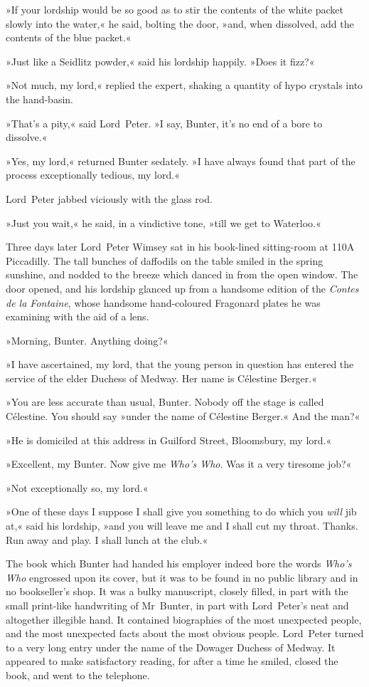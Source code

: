 »If your lordship would be so good as to stir the contents of the white packet slowly into the water,« he said, bolting the door, »and, when dissolved, add the contents of the blue packet.«

»Just like a Seidlitz powder,« said his lordship happily. »Does it fizz?«

»Not much, my lord,« replied the expert, shaking a quantity of hypo crystals into the hand-basin.

»That's a pity,« said Lord~Peter. »I say, Bunter, it's no end of a bore to dissolve.«

»Yes, my lord,« returned Bunter sedately. »I have always found that part of the process exceptionally tedious, my lord.«

Lord~Peter jabbed viciously with the glass rod.

»Just you wait,« he said, in a vindictive tone, »till we get to Waterloo.«

\divider
Three days later Lord~Peter Wimsey sat in his book-lined sitting-room at 110A Piccadilly. The tall bunches of daffodils on the table smiled in the spring sunshine, and nodded to the breeze which danced in from the open window. The door opened, and his lordship glanced up from a handsome edition of the \textit{Contes de la Fontaine}, whose handsome hand-coloured Fragonard plates he was examining with the aid of a lens.

»Morning, Bunter. Anything doing?«

»I have ascertained, my lord, that the young person in question has entered the service of the elder Duchess of Medway. Her name is Célestine Berger.«

»You are less accurate than usual, Bunter. Nobody off the stage is called Célestine. You should say »under the name of Célestine Berger.« And the man?«

»He is domiciled at this address in Guilford Street, Bloomsbury, my lord.«

»Excellent, my Bunter. Now give me \textit{Who's Who}. Was it a very tiresome job?«

»Not exceptionally so, my lord.«

»One of these days I suppose I shall give you something to do which you \textit{will} jib at,« said his lordship, »and you will leave me and I shall cut my throat. Thanks. Run away and play. I shall lunch at the club.«

The book which Bunter had handed his employer indeed bore the words \textit{Who's Who} engrossed upon its cover, but it was to be found in no public library and in no bookseller's shop. It was a bulky manuscript, closely filled, in part with the small print-like handwriting of Mr~Bunter, in part with Lord~Peter's neat and altogether illegible hand. It contained biographies of the most unexpected people, and the most unexpected facts about the most obvious people. Lord~Peter turned to a very long entry under the name of the Dowager Duchess of Medway. It appeared to make satisfactory reading, for after a time he smiled, closed the book, and went to the telephone.

